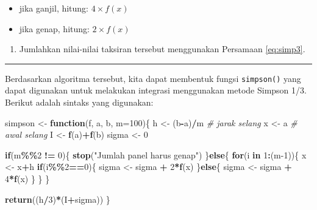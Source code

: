\documentclass[
]{book}
\newenvironment{Shaded}{\begin{snugshade}}{\end{snugshade}}
\newcommand{\AttributeTok}[1]{\textcolor[rgb]{0.13,0.29,0.53}{#1}}
\newcommand{\CommentTok}[1]{\textcolor[rgb]{0.56,0.35,0.01}{\textit{#1}}}
\newcommand{\ControlFlowTok}[1]{\textcolor[rgb]{0.13,0.29,0.53}{\textbf{#1}}}
\newcommand{\DecValTok}[1]{\textcolor[rgb]{0.00,0.00,0.81}{#1}}
\newcommand{\FunctionTok}[1]{\textcolor[rgb]{0.13,0.29,0.53}{\textbf{#1}}}
\newcommand{\NormalTok}[1]{#1}
\newcommand{\OtherTok}[1]{\textcolor[rgb]{0.56,0.35,0.01}{#1}}
\newcommand{\SpecialCharTok}[1]{\textcolor[rgb]{0.81,0.36,0.00}{\textbf{#1}}}
\newcommand{\StringTok}[1]{\textcolor[rgb]{0.31,0.60,0.02}{#1}}
\providecommand{\tightlist}{%
  \setlength{\itemsep}{0pt}\setlength{\parskip}{0pt}}
\theoremstyle{definition}
\theoremstyle{definition}
\theoremstyle{definition}
\theoremstyle{definition}
\theoremstyle{remark}
\begin{document}
\begin{itemize}
\tightlist
\item
  jika ganjil, hitung: \(4\times f\left(x\right)\)
\item
  jika genap, hitung: \(2\times f\left(x\right)\)
\end{itemize}

\begin{enumerate}
\def\labelenumi{\arabic{enumi}.}
\setcounter{enumi}{5}
\tightlist
\item
  Jumlahkan nilai-nilai taksiran tersebut menggunakan Persamaan \eqref{eq:simp3}.
\end{enumerate}

\begin{center}\rule{0.5\linewidth}{0.5pt}\end{center}

Berdasarkan algoritma tersebut, kita dapat membentuk fungsi \texttt{simpson()} yang dapat digunakan untuk melakukan integrasi menggunakan metode Simpson 1/3. Berikut adalah sintaks yang digunakan:

\begin{Shaded}
\begin{Highlighting}[]
\NormalTok{simpson }\OtherTok{\textless{}{-}} \ControlFlowTok{function}\NormalTok{(f, a, b, }\AttributeTok{m=}\DecValTok{100}\NormalTok{)\{}
\NormalTok{  h }\OtherTok{\textless{}{-}}\NormalTok{ (b}\SpecialCharTok{{-}}\NormalTok{a)}\SpecialCharTok{/}\NormalTok{m }\CommentTok{\# jarak selang}
\NormalTok{  x }\OtherTok{\textless{}{-}}\NormalTok{ a }\CommentTok{\# awal selang}
\NormalTok{  I }\OtherTok{\textless{}{-}} \FunctionTok{f}\NormalTok{(a)}\SpecialCharTok{+}\FunctionTok{f}\NormalTok{(b)}
\NormalTok{  sigma }\OtherTok{\textless{}{-}} \DecValTok{0}
  
  \ControlFlowTok{if}\NormalTok{(m}\SpecialCharTok{\%\%}\DecValTok{2} \SpecialCharTok{!=} \DecValTok{0}\NormalTok{)\{}
    \FunctionTok{stop}\NormalTok{(}\StringTok{"Jumlah panel harus genap"}\NormalTok{)}
\NormalTok{  \}}\ControlFlowTok{else}\NormalTok{\{}
    \ControlFlowTok{for}\NormalTok{(i }\ControlFlowTok{in} \DecValTok{1}\SpecialCharTok{:}\NormalTok{(m}\DecValTok{{-}1}\NormalTok{))\{}
\NormalTok{    x }\OtherTok{\textless{}{-}}\NormalTok{ x}\SpecialCharTok{+}\NormalTok{h}
    \ControlFlowTok{if}\NormalTok{(i}\SpecialCharTok{\%\%}\DecValTok{2}\SpecialCharTok{==}\DecValTok{0}\NormalTok{)\{}
\NormalTok{      sigma }\OtherTok{\textless{}{-}}\NormalTok{ sigma }\SpecialCharTok{+} \DecValTok{2}\SpecialCharTok{*}\FunctionTok{f}\NormalTok{(x)}
\NormalTok{    \}}\ControlFlowTok{else}\NormalTok{\{}
\NormalTok{      sigma }\OtherTok{\textless{}{-}}\NormalTok{ sigma }\SpecialCharTok{+} \DecValTok{4}\SpecialCharTok{*}\FunctionTok{f}\NormalTok{(x)}
\NormalTok{      \}}
\NormalTok{    \}}
\NormalTok{  \}}
  
  \FunctionTok{return}\NormalTok{((h}\SpecialCharTok{/}\DecValTok{3}\NormalTok{)}\SpecialCharTok{*}\NormalTok{(I}\SpecialCharTok{+}\NormalTok{sigma))}
\NormalTok{\}}
\end{Highlighting}
\end{Shaded}
\end{document}
